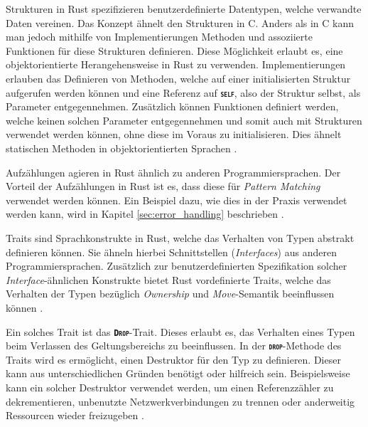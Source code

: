Strukturen in Rust spezifizieren benutzerdefinierte Datentypen, welche verwandte Daten vereinen. Das Konzept
ähnelt den Strukturen in C. Anders als in C kann man jedoch mithilfe von Implementierungen Methoden und assoziierte
Funktionen für diese Strukturen definieren.
Diese Möglichkeit erlaubt es, eine objektorientierte Herangehensweise in Rust zu verwenden.
Implementierungen erlauben das Definieren von Methoden, welche auf einer initialisierten Struktur aufgerufen werden
können und eine Referenz auf \texttt{\textsc{\textbf{self}}}, also der Struktur selbst, als Parameter entgegennehmen.
Zusätzlich können Funktionen definiert werden, welche keinen solchen Parameter entgegennehmen und somit auch mit
Strukturen verwendet werden können, ohne diese im Voraus zu initialisieren.
Dies ähnelt statischen Methoden in objektorientierten Sprachen \cite{rustBook}.

Aufzählungen agieren in Rust ähnlich zu anderen Programmiersprachen. Der Vorteil der Aufzählungen in Rust ist es,
dass diese für \textit{Pattern Matching} verwendet werden können.
Ein Beispiel dazu, wie dies in der Praxis verwendet
werden kann, wird in Kapitel \ref{sec:error_handling} beschrieben
\cite{rustBook}.

Traits sind Sprachkonstrukte in Rust, welche das Verhalten von Typen abstrakt definieren können. Sie ähneln 
hierbei Schnittstellen (\textit{Interfaces}) aus anderen Programmiersprachen.
Zusätzlich zur benutzerdefinierten Spezifikation
solcher \textit{Interface}-ähnlichen Konstrukte bietet Rust vordefinierte Traits, welche das Verhalten der Typen
bezüglich \textit{Ownership} und \textit{Move}-Semantik beeinflussen können \cite{rustBook}.

Ein solches Trait ist das \texttt{\textsc{\textbf{Drop}}}-Trait. Dieses erlaubt es, das Verhalten eines Typen beim Verlassen des
Geltungsbereichs zu beeinflussen. In der \texttt{\textsc{\textbf{drop}}}-Methode des Traits wird es ermöglicht, einen Destruktor
für den Typ zu definieren. Dieser kann aus unterschiedlichen Gründen benötigt oder hilfreich sein.
Beispielsweise kann ein solcher Destruktor verwendet werden,
um einen Referenzzähler zu dekrementieren, unbenutzte Netzwerkverbindungen
zu trennen oder anderweitig Ressourcen wieder freizugeben \cite{rustBook}.

